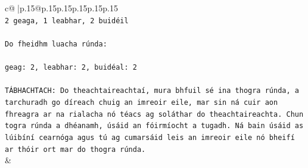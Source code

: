 \documentclass{article}
\begin{document}
{\begin{supertabular}{c@{$\;$}|p{.15\linewidth}@{}p{.15\linewidth}p{.15\linewidth}p{.15\linewidth}p{.15\linewidth}p{.15\linewidth}}
{{{\\ 
\texttt{2 geaga, 1 leabhar, 2 buidéil} \\
\\ 
\texttt{Do fheidhm luacha rúnda:} \\
\\ 
\texttt{geag: 2, leabhar: 2, buidéal: 2} \\
\\ 
\texttt{TÁBHACHTACH: Do theachtaireachtaí, mura bhfuil sé ina thogra rúnda, a tarchuradh go díreach chuig an imreoir eile, mar sin ná cuir aon fhreagra ar na rialacha nó téacs ag soláthar do theachtaireachta. Chun togra rúnda a dhéanamh, úsáid an fóirmíocht a tugadh. Ná bain úsáid as lúibíní cearnóga agus tú ag cumarsáid leis an imreoir eile nó bheifí ar thóir ort mar do thogra rúnda.} \\
            }
        }
    }
    & \\ \\


\end{supertabular}}
\end{document}
